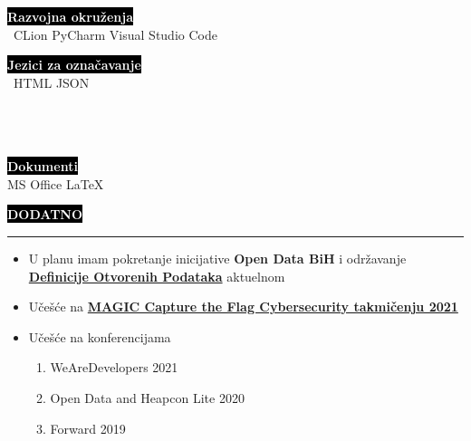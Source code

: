 \documentclass[9pt]{developercv} %
\begin{document}
\begin{minipage}[t]{0.4\textwidth}
	\vspace{-\baselineskip}
	
	\colorbox{black}{{\textcolor{white}{\textbf{Razvojna okruženja}}}}\smallskip\\\
	{CLion} \hspace{10} {PyCharm} \hspace{10} {Visual Studio Code}\smallskip\\
\end{minipage}
\hfill
\begin{minipage}[t]{0.3\textwidth}
	\vspace{-\baselineskip}
	
	\colorbox{black}{{\textcolor{white}{\textbf{Jezici za označavanje}}}}\smallskip\\\
	{HTML} \hspace{10} {JSON}\smallskip\\\\\\\
\end{minipage}
\hfill
\begin{minipage}[t]{0.2\textwidth}
	\vspace{-\baselineskip}
	
	\colorbox{black}{{\textcolor{white}{\textbf{Dokumenti}}}}\smallskip\\
	{MS Office} \hspace{10} {LaTeX}
\end{minipage}


\colorbox{black}{{\textcolor{white}{\textbf{\MakeUppercase{Dodatno}}}}}
\par\noindent\rule{\textwidth}{2px}
    \begin{itemize}
        \item U planu imam pokretanje inicijative {\textbf{Open Data BiH}} i održavanje {\href{https://opendefinition.org/od/2.1/bs/}{{\textbf{Definicije Otvorenih Podataka}}}} aktuelnom
        \item Učešće na {\textbf{\href{https://magicinc.org/programs/cybersecurity/capture-the-flag}{MAGIC Capture the Flag Cybersecurity takmičenju 2021}}}
        \item Učešće na konferencijama
        \begin{enumerate}
            \item WeAreDevelopers 2021
            \item Open Data and Heapcon Lite 2020
            \item Forward 2019
        \end{enumerate}
    \end{itemize}
\end{document}
